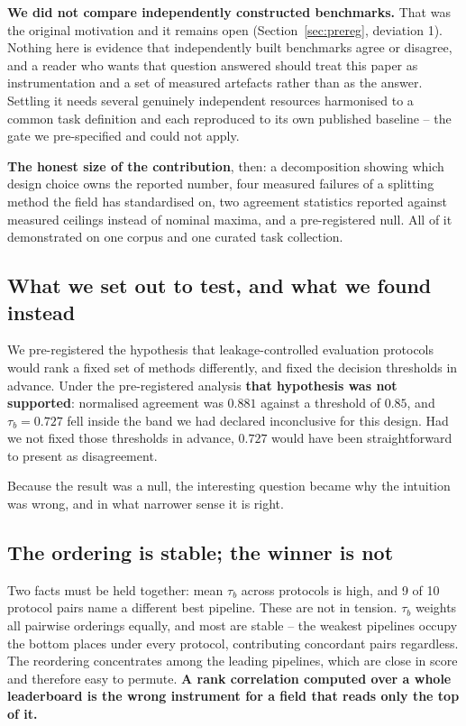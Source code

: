 \documentclass[11pt,a4paper]{article}
\begin{document}
\textbf{We did not compare independently constructed benchmarks.} That was the original
motivation and it remains open (Section~\ref{sec:prereg}, deviation 1). Nothing here is
evidence that independently built benchmarks agree or disagree, and a reader who wants that
question answered should treat this paper as instrumentation and a set of measured
artefacts rather than as the answer. Settling it needs several genuinely independent
resources harmonised to a common task definition and each reproduced to its own published
baseline -- the gate we pre-specified and could not apply.

\textbf{The honest size of the contribution}, then: a decomposition showing which design
choice owns the reported number, four measured failures of a splitting method the field has
standardised on, two agreement statistics reported against measured ceilings instead of
nominal maxima, and a pre-registered null. All of it demonstrated on one corpus and one
curated task collection.

\subsection{What we set out to test, and what we found instead}

We pre-registered the hypothesis that leakage-controlled evaluation protocols would rank a
fixed set of methods differently, and fixed the decision thresholds in advance. Under the
pre-registered analysis \textbf{that hypothesis was not supported}: normalised agreement
was $0.881$ against a threshold of $0.85$, and $\tau_b = 0.727$ fell inside the band we
had declared inconclusive for this design. Had we not fixed those thresholds in advance,
$0.727$ would have been straightforward to present as disagreement.

Because the result was a null, the interesting question became why the intuition was
wrong, and in what narrower sense it is right.

\subsection{The ordering is stable; the winner is not}

Two facts must be held together: mean $\tau_b$ across protocols is high, and 9 of 10
protocol pairs name a different best pipeline. These are not in tension. $\tau_b$ weights
all pairwise orderings equally, and most are stable -- the weakest pipelines occupy the
bottom places under every protocol, contributing concordant pairs regardless. The
reordering concentrates among the leading pipelines, which are close in score and therefore
easy to permute. \textbf{A rank correlation computed over a whole leaderboard is the wrong
instrument for a field that reads only the top of it.}
\end{document}
